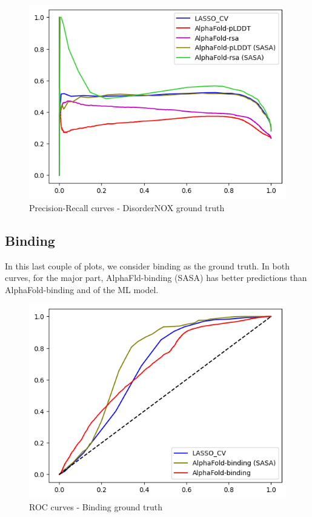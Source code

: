 \begin{figure}[h!]
    \centering
    \includegraphics[scale = 0.73]{res/ML/precisionrecall-disordernox.png}
    \caption{Precision-Recall curves - DisorderNOX ground truth}
\end{figure}

\pagebreak

\subsection{Binding}

In this last couple of plots, we consider binding as the ground truth. In both curves, for the major part, AlphaFld-binding (SASA) has better predictions than AlphaFold-binding and of the ML model. 
\begin{figure}[h!]
    \centering
    \includegraphics[scale = 0.75]{res/ML/roc-binding.png}
    \caption{ROC curves - Binding ground truth}
\end{figure}

